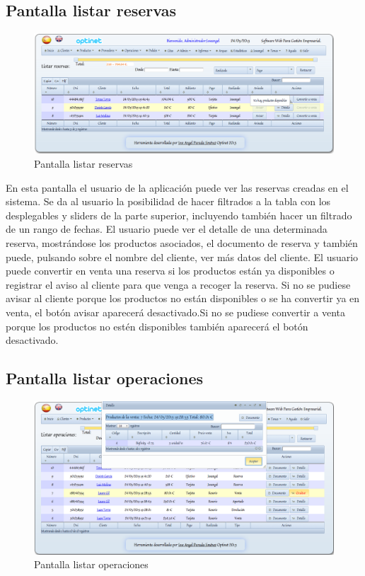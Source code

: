 \documentclass[a4paper,11pt]{book}
\begin{document}
\newpage
\subsection {Pantalla listar reservas}

\begin{figure}[!htb]
  \centering
    \includegraphics[scale=0.35]{caplistarreservas.png}
  \caption{Pantalla listar reservas}
  \label{a}
\end{figure}

En esta pantalla el usuario de la aplicación puede ver las reservas creadas en el sistema. Se da al usuario la posibilidad de hacer filtrados a la tabla con los desplegables y sliders de la parte superior, incluyendo también hacer un filtrado de un rango de fechas. El usuario puede ver el detalle de una determinada reserva, mostrándose los productos asociados, el documento de reserva y también puede, pulsando sobre el nombre del cliente, ver más datos del cliente. El usuario puede convertir en venta una reserva si los productos están ya disponibles o registrar el aviso al cliente para que venga a recoger la reserva. Si no se pudiese avisar al cliente porque los productos no están disponibles o se ha convertir ya en venta, el botón avisar aparecerá desactivado.Si no se pudiese convertir a venta porque los productos no estén disponibles también aparecerá el botón desactivado.

\newpage
\subsection {Pantalla listar operaciones}

\begin{figure}[!htb]
  \centering
    \includegraphics[scale=0.35]{caplistaroperaciones.png}
  \caption{Pantalla listar operaciones}
  \label{a}
\end{figure}
\end{document}
